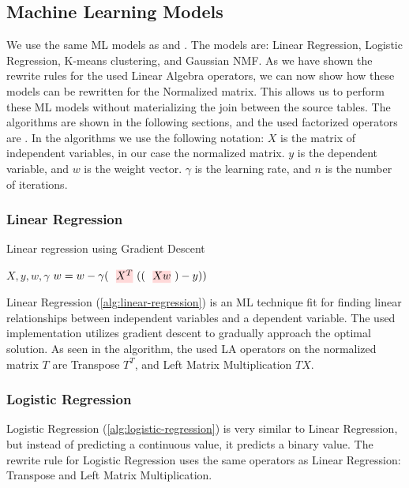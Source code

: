 \subsection{Machine Learning Models}
We use the same ML models as \cite{morpheus} and \cite{schijndel_cost_estimation}. The models are: Linear Regression, Logistic Regression, K-means clustering, and Gaussian NMF. As we have shown the rewrite rules for the used Linear Algebra operators, we can now show how these models can be rewritten for the Normalized matrix. This allows us to perform these ML models without materializing the join between the source tables. The algorithms are shown in the following sections, and the used factorized operators are . In the algorithms we use the following notation: $X$ is the matrix of independent variables, in our case the normalized matrix. $y$ is the dependent variable, and $w$ is the weight vector. $\gamma$ is the learning rate, and $n$ is the number of iterations.

\subsubsection{Linear Regression}
\begin{algorithm}[ht!]
    \caption[Linear regression]{Linear regression using Gradient Descent
        \cite{morpheus}}\label{alg:linear-regression}
    \begin{algorithmic}
        \Require $X, y , w, \gamma$
        \State $w = w - \gamma (\text{\red{$X^T$}}((\text{\red{$X w$}}) - y))$
        \EndFor
    \end{algorithmic}
\end{algorithm}
Linear Regression (\autoref{alg:linear-regression}) is an ML technique fit for finding linear relationships between independent variables and a dependent variable. The used implementation utilizes gradient descent to gradually approach the optimal solution. As seen in the algorithm, the used LA operators on the normalized matrix $T$ are Transpose $T^T$, and Left Matrix Multiplication $TX$.

\subsubsection{Logistic Regression}
Logistic Regression (\autoref{alg:logistic-regression}) is very similar to Linear Regression, but instead of predicting a continuous value, it predicts a binary value. The rewrite rule for Logistic Regression uses the same operators as Linear Regression: Transpose and Left Matrix Multiplication.

